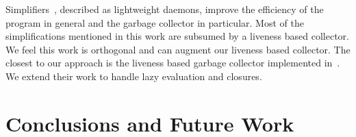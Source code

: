 \documentclass[preprint,9pt]{sigplanconf}
\begin{document}
Simplifiers~\cite{ONeill},  described   as  lightweight
daemons,  improve  the  efficiency of  the  program  in
general and  the garbage collector in  particular. Most
of  the  simplifications  mentioned in  this  work  are
subsumed by  a liveness  based collector. We  feel this
work is  orthogonal and can augment  our liveness based
collector.  The closest to our approach is the liveness
based        garbage       collector        implemented
in~\cite{asati14lgc}.  We extend  their work  to handle
lazy evaluation and closures.
 




\vskip -5mm
\section{Conclusions and Future Work}
\label{sec:conclusion}
\end{document}
